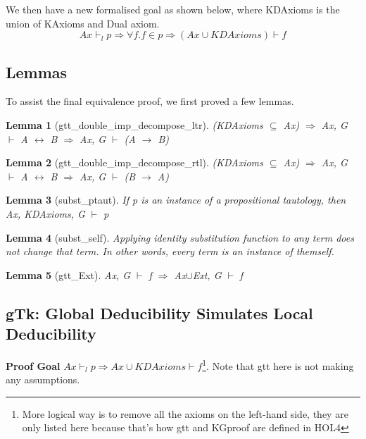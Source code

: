 \documentclass[submission,copyright,creativecommons]{eptcs}
\newtheorem{lemma}{Lemma}
\begin{document}
We then have a new formalised goal as shown below, where KDAxioms is the union 
of KAxioms and Dual axiom.
$$Ax \vdash_l p \Rightarrow \forall f. f \in p \Rightarrow (Ax\cup KDAxioms) \vdash f$$


\subsection{Lemmas}
To assist the final equivalence proof, we first proved a few lemmas.

\begin{lemma}[gtt\_double\_imp\_decompose\_ltr]
(KDAxioms $\subseteq$ Ax) $\Rightarrow$ Ax, G $\vdash$ A $\leftrightarrow$ B $\Rightarrow$ Ax, G $\vdash$ (A $\rightarrow$ B)
\label{ltr}
\end{lemma}

\begin{lemma}[gtt\_double\_imp\_decompose\_rtl]
 (KDAxioms $\subseteq$ Ax) $\Rightarrow$ Ax, G $\vdash$ A $\leftrightarrow$ B $\Rightarrow$ Ax, G $\vdash$ (B $\rightarrow$ A)
 \label{rtl}
 \end{lemma}

\begin{lemma}[subst\_ptaut]
 If p is an instance of a propositional tautology, then Ax, KDAxioms, G $\vdash$ p 
\label{sp}
\end{lemma}

\begin{lemma}[subst\_self]
 Applying identity substitution function to any term does not change that term.
 In other words, every term is an instance of themself. 
\label{ss}
\end{lemma}

\begin{lemma}[gtt\_Ext]
 Ax, G $\vdash$ f $\Rightarrow$ Ax$\cup$Ext, G $\vdash$ f 
\label{ext}
\end{lemma}

\subsection{gTk: Global Deducibility Simulates Local Deducibility}
\textbf{Proof Goal} $Ax \vdash_l p \Rightarrow Ax \cup KDAxioms \vdash f$\footnote{More 
logical way is to remove all the 
axioms on the left-hand side, they are only listed here because that's how gtt and KGproof 
are defined in HOL4}. Note that gtt here is not making any assumptions.
\end{document}
